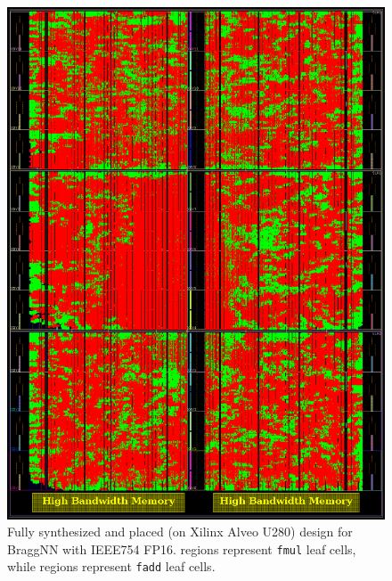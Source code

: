 \begin{figure}
	\includegraphics[width=\columnwidth]{figures/full_fpga}
	\caption{Fully synthesized and placed (on Xilinx Alveo U280) design for BraggNN with IEEE754 FP16. \crule[red]{0.25cm}{0.25cm} regions represent \texttt{fmul} leaf cells, while \crule[green]{0.25cm}{0.25cm} regions represent \texttt{fadd} leaf cells.}\label{fig:placed_braggnn}
\end{figure}

